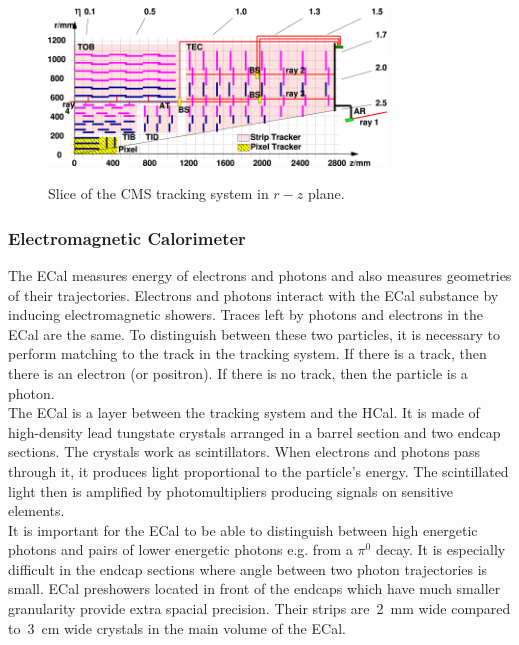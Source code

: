 

\begin{figure}[htb]
  \begin{center}
    {\includegraphics[width=0.8\textwidth]{../figs/Exp/tracker_slice.png}}
    \caption{Slice of the CMS tracking system in $r-z$ plane.}
    \label{fig:tracker_slice}
  \end{center}
\end{figure}

\subsubsection{Electromagnetic Calorimeter}

The ECal measures energy of electrons and photons and also measures geometries of their trajectories. Electrons and photons interact with the ECal substance by inducing electromagnetic showers. Traces left by photons and electrons in the ECal are the same. To distinguish between these two particles, it is necessary to perform matching to the track in the tracking system. If there is a track, then there is an electron (or positron). If there is no track, then the particle is a photon.\\

The ECal is a layer between the tracking system and the HCal. It is made of high-density lead tungstate crystals arranged in a barrel section and two endcap sections. The crystals work as scintillators. When electrons and photons pass through it, it produces light proportional to the particle's energy. The scintillated light then is amplified by photomultipliers producing signals on sensitive elements.\\

It is important for the ECal to be able to distinguish between high energetic photons and pairs of lower energetic photons e.g. from a $\pi^0$ decay. It is especially difficult in the endcap sections where angle between two photon trajectories is small. ECal preshowers located in front of the endcaps which have much smaller granularity provide extra spacial precision. Their strips are~2~mm wide compared to~3~cm wide crystals in the main volume of the ECal.\\

